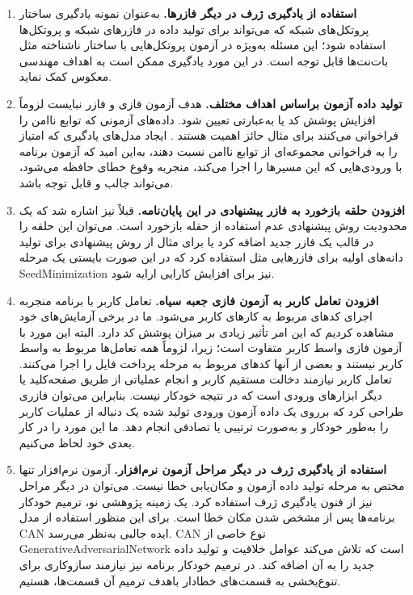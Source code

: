 {\begin{enumerate}
{	 
	}

\item{
	\textbf{استفاده از یادگیری ژرف در دیگر فازرها.}
	به‌عنوان نمونه یادگیری ساختار پروتکل‌های شبکه که می‌تواند برای تولید داده در فازرهای شبکه و پروتکل‌ها استفاده شود؛ این مسئله به‌ویژه در آزمون پروتکل‌هایی با ساختار ناشناخته مثل بات‌نت‌ها قابل توجه است. در این مورد یادگیری ممکن است به اهداف مهندسی معکوس کمک نماید.
	
}

\item{
	\textbf{تولید داده آزمون براساس اهداف مختلف.}
هدف آزمون فازی و فازر نبایست لزوماً افزایش پوشش کد یا به‌عبارتی
  تعیین شود. داده‌های آزمونی که توابع ناامن را فراخوانی می‌کنند برای مثال حائز اهمیت هستند 
  \cite{amini1395}.
  ایجاد مدل‌های یادگیری که امتیاز را به فراخوانی مجموعه‌ای از توابع ناامن نسبت دهند، به‌این امید که آزمون برنامه با ورودی‌هایی که این مسیرها را اجرا می‌کند، منجربه‌ وقوع خطای حافظه می‌شود، می‌تواند جالب و قابل توجه باشد.  
}

\item{
\textbf{افزودن حلقه بازخورد به فازر پیشنهادی  در این پایان‌نامه.}
قبلاً نیز اشاره شد که یک محدودیت روش پیشنهادی عدم استفاده از حقله بازخورد است. می‌توان این حلقه را در قالب یک فازر جدید اضافه کرد یا برای مثال از روش پیشنهادی برای تولید دانه‌های اولیه برای فازرهایی مثل  استفاده کرد که در این صورت بایستی یک مرحله \gls{SeedMinimization} نیز برای افزایش کارایی  ارایه شود.

}

\item{
	\textbf{افزودن تعامل کاربر به آزمون فازی جعبه سیاه.}
	تعامل کاربر با برنامه منجربه اجرای کدهای مربوط ‌به کارهای کاربر می‌شود. ما در برخی آزمایش‌های خود مشاهده کردیم که این امر تأثیر زیادی بر میزان پوشش کد دارد. البته این مورد با آزمون فازی واسط کاربر متفاوت است؛ زیرا، لزوماً همه تعامل‌ها مربوط به واسط کاربر نیستند و بعضی از آنها کدهای مربوط به مرحله پرداخت فایل را اجرا می‌کنند. تعامل کاربر نیازمند دخالت مستقیم کاربر  و انجام عملیاتی از طریق صفحه‌کلید یا دیگر ابزارهای ورودی است که در نتیجه خودکار نیست. بنابراین می‌توان فازری طراحی کرد که برروی یک داده آزمون ورودی تولید شده یک دنباله از عملیات کاربر را به‌طور خودکار و به‌صورت ترتیبی یا تصادفی انجام دهد. ما این مورد را در کار بعدی خود لحاظ می‌کنیم. 
	
}

\item{
	\textbf{استفاده از یادگیری ژرف در دیگر مراحل آزمون نرم‌افزار.}
	آزمون نرم‌افزار تنها مختص به مرحله تولید داده آزمون و مکان‌یابی خطا نیست. می‌توان در دیگر مراحل نیز از فنون یادگیری ژرف استفاده کرد. یک زمینه پژوهشی نو، ترمیم خودکار برنامه‌ها پس از مشخص شدن مکان خطا است. برای این منظور استفاده از مدل \gls{CAN} 
	\cite{DBLP:journals/corr/ElgammalLEM17}
	ایده جالبی به‌نظر می‌رسد. \gls{CAN}
	نوع خاصی از \gls{GenerativeAdversarialNetwork} است که تلاش می‌کند عوامل خلاقیت و تولید داده جدید را به آن اضافه کند. در ترمیم خودکار برنامه نیز نیازمند سازوکاری برای تنوع‌بخشی به قسمت‌های خطادار باهدف ترمیم آن قسمت‌ها، هستیم.
	
}
\end{enumerate}}
